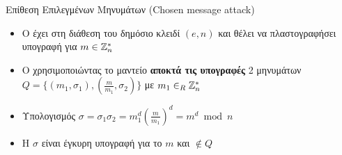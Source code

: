 \documentclass[handout]{beamer}
\begin{document}
\begin{frame}{Επίθεση Επιλεγμένων Μηνυμάτων (Chosen message attack)}
\begin{itemize}
\item O \adv έχει στη διάθεση του δημόσιο κλειδί $(e,n)$ και θέλει να πλαστογραφήσει υπογραφή για $m \in \mathbb{Z}^*_n$
\pause
\item O \adv χρησιμοποιώντας το μαντείο \textbf{αποκτά τις υπογραφές} 2 μηνυμάτων $Q = \{ (m_1, \sigma_1), (\frac{m}{m_1}, \sigma_2) \}$ με $m_1 \in_R \mathbb{Z}^*_n $
\pause
\item Υπολογισμός $\sigma = \sigma_1  \sigma_2 = m_1^d (\frac{m}{m_1})^d = m ^ d \bmod{n}$
\pause
\item H $\sigma$ είναι έγκυρη υπογραφή για το $m$ και $\not \in Q$
\end{itemize}
\end{frame}
\end{document}
